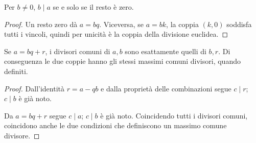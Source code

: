 \begin{corollario}
Per $b\ne0$, $b\mid a$ se e solo se il resto è zero.
\end{corollario}
\begin{proof}
Un resto zero dà $a=bq$. Viceversa, se $a=bk$, la coppia $(k,0)$ soddisfa tutti i vincoli, quindi per unicità è la coppia della divisione euclidea.
\end{proof}

\begin{lemma}\label{lem:passo-euclideo}
Se $a=bq+r$, i divisori comuni di $a,b$ sono esattamente quelli di $b,r$. Di conseguenza le due coppie hanno gli stessi massimi comuni divisori, quando definiti.
\end{lemma}
\begin{proof}
 Dall'identità $r=a-qb$ e dalla proprietà delle combinazioni segue $c\mid r$; $c\mid b$ è già noto.

 Da $a=bq+r$ segue $c\mid a$; $c\mid b$ è già noto. Coincidendo tutti i divisori comuni, coincidono anche le due condizioni che definiscono un massimo comune divisore.
\end{proof}

